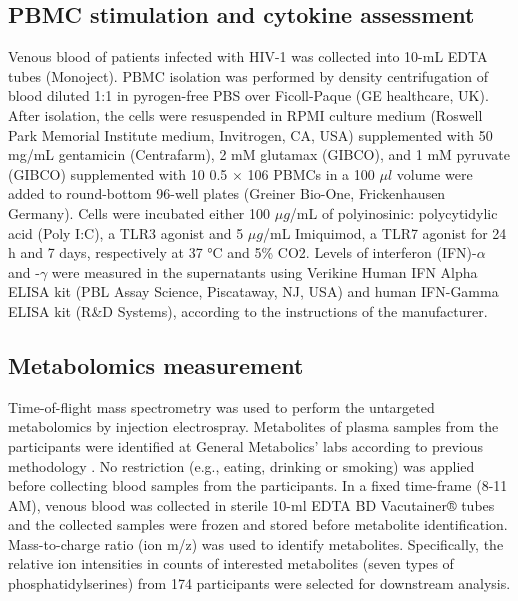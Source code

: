 \documentclass{book}
\begin{document}
\begin{refsection}
\subsection*{PBMC stimulation and cytokine assessment}
Venous blood of patients infected with HIV-1 was collected into 10-mL EDTA tubes (Monoject).
PBMC isolation was performed by density centrifugation of blood diluted 1:1 in pyrogen-free PBS over Ficoll-Paque (GE healthcare, UK).
After isolation, the cells were resuspended in RPMI culture medium (Roswell Park Memorial Institute medium, Invitrogen, CA, USA) supplemented with 50 mg/mL gentamicin (Centrafarm), 2 mM glutamax (GIBCO), and 1 mM pyruvate (GIBCO) supplemented with 10%
0.5 $\times$ 106 PBMCs in a 100 $\mu l$ volume were added to round-bottom 96-well plates (Greiner Bio-One, Frickenhausen Germany).
Cells were incubated either 100 $\mu g$/mL of polyinosinic: polycytidylic acid (Poly I:C), a TLR3 agonist and 5 $\mu g$/mL Imiquimod, a TLR7 agonist for 24 h and 7 days, respectively at 37 °C and 5\% CO2.
Levels of interferon (IFN)-$\alpha$ and -$\gamma$ were measured in the supernatants using Verikine Human IFN Alpha ELISA kit (PBL Assay Science, Piscataway, NJ, USA) and human IFN-Gamma ELISA kit (R\&D Systems), according to the instructions of the manufacturer.

\subsection*{Metabolomics measurement}
Time-of-flight mass spectrometry was used to perform the untargeted metabolomics by injection electrospray.
Metabolites of plasma samples from the participants were identified at General Metabolics' labs according to previous methodology \cite{Fuhrer2011High}.
No restriction (e.g., eating, drinking or smoking) was applied before collecting blood samples from the participants.
In a fixed time-frame (8-11 AM), venous blood was collected in sterile 10-ml EDTA BD Vacutainer® tubes and the collected samples were frozen and stored before metabolite identification.
Mass-to-charge ratio (ion m/z) was used to identify metabolites.
Specifically, the relative ion intensities in counts of interested metabolites (seven types of phosphatidylserines) from 174 participants were selected for downstream analysis.


\end{refsection}
\end{document}
